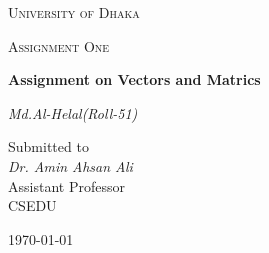 \documentclass[12pt,a4paper]{report}
\begin{document}
\begin{titlepage}
\centering
{\scshape\LARGE University of Dhaka \par}
\vspace{2cm}
{\scshape\Large Assignment One\par}
\vspace{2cm}
{\huge\bfseries Assignment on Vectors and Matrics\par}
\vspace{2cm}
{\Large\itshape Md.Al-Helal(Roll-51)\par}
\vfill
Submitted to\\
\vspace{0.5cm}
{\itshape Dr. Amin Ahsan Ali} \\ Assistant Professor\\CSEDU
\vfill
{\large \today\par}
\end{titlepage}
\end{document}
